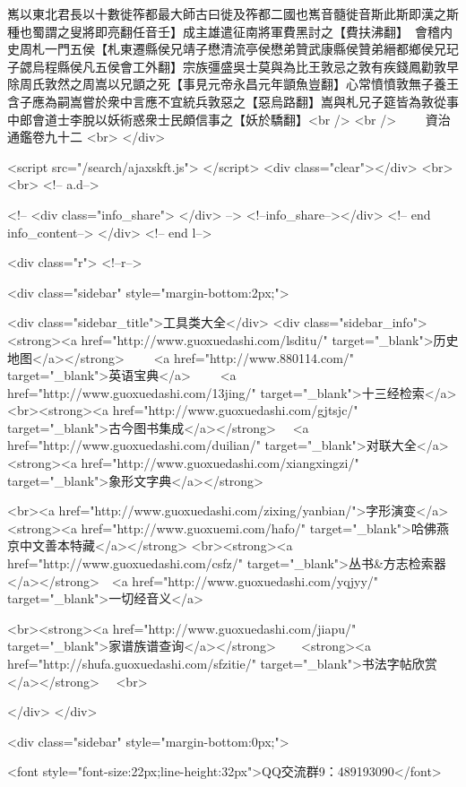 嶲以東北君長以十數徙筰都最大師古曰徙及筰都二國也嶲音髓徙音斯此斯即漢之斯種也蜀謂之叟將即亮翻任音壬】成主雄遣征南將軍費黑討之【費扶沸翻】　會稽内史周札一門五侯【札東遷縣侯兄靖子懋清流亭侯懋弟贊武康縣侯贊弟縉都鄉侯兄玘子勰烏程縣侯凡五侯會工外翻】宗族彊盛吳士莫與為比王敦忌之敦有疾錢鳳勸敦早除周氏敦然之周嵩以兄顗之死【事見元帝永昌元年顗魚豈翻】心常憤憤敦無子養王含子應為嗣嵩嘗於衆中言應不宜統兵敦惡之【惡烏路翻】嵩與札兄子筵皆為敦從事中郎會道士李脫以妖術惑衆士民頗信事之【妖於驕翻】<br />
<br />
　　資治通鑑卷九十二  <br>
   </div> 

<script src="/search/ajaxskft.js"> </script>
 <div class="clear"></div>
<br>
<br>
 <!-- a.d-->

 <!--
<div class="info_share">
</div> 
-->
 <!--info_share--></div>   <!-- end info_content-->
  </div> <!-- end l-->

<div class="r">   <!--r-->



<div class="sidebar"  style="margin-bottom:2px;">

 
<div class="sidebar_title">工具类大全</div>
<div class="sidebar_info">
<strong><a href="http://www.guoxuedashi.com/lsditu/" target="_blank">历史地图</a></strong>　　
<a href="http://www.880114.com/" target="_blank">英语宝典</a>　　
<a href="http://www.guoxuedashi.com/13jing/" target="_blank">十三经检索</a>　
<br><strong><a href="http://www.guoxuedashi.com/gjtsjc/" target="_blank">古今图书集成</a></strong>　
<a href="http://www.guoxuedashi.com/duilian/" target="_blank">对联大全</a>　<strong><a href="http://www.guoxuedashi.com/xiangxingzi/" target="_blank">象形文字典</a></strong>　

<br><a href="http://www.guoxuedashi.com/zixing/yanbian/">字形演变</a>　　<strong><a href="http://www.guoxuemi.com/hafo/" target="_blank">哈佛燕京中文善本特藏</a></strong>
<br><strong><a href="http://www.guoxuedashi.com/csfz/" target="_blank">丛书&方志检索器</a></strong>　<a href="http://www.guoxuedashi.com/yqjyy/" target="_blank">一切经音义</a>　　

<br><strong><a href="http://www.guoxuedashi.com/jiapu/" target="_blank">家谱族谱查询</a></strong>　　<strong><a href="http://shufa.guoxuedashi.com/sfzitie/" target="_blank">书法字帖欣赏</a></strong>　
<br>

</div>
</div>


<div class="sidebar" style="margin-bottom:0px;">

<font style="font-size:22px;line-height:32px">QQ交流群9：489193090</font>


